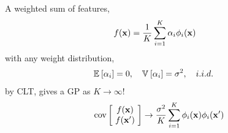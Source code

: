 \newsavebox\unistrain
\begin{lrbox}{\unistrain}
\hspace{0.1cm}
  \begin{minipage}{0.53\textwidth}
A weighted sum of features,
    \begin{align*}
f(\vx) & %
= \frac{1}{K} \sum_{i=1}^K \alpha_i \phi_i(\vx)
    \end{align*} 
with any weight distribution,
    \begin{align*}
\mathbb{E}_{} \left[ {\alpha_i} \right] & = 0, \quad \mathbb{V}_{} \left[ {\alpha_i} \right] = \sigma^2, \quad i.i.d.\ 
    \end{align*} 
by CLT, gives a GP as $K \to \infty$!
        \begin{align*}
\operatorname{cov} \left[ \! \begin{array}{c} f({\bf{x}}) \\ f({\bf{x}}') \end{array} \! \right] \to \frac{\sigma^2}{K}\sum_{i=1}^K \phi_i({\bf{x}})\phi_i({\bf{x}}')
    \end{align*} 
  \end{minipage}
\end{lrbox}


\def\layersep{2cm}
\def\nodesep{1.5cm}
\def\nodesize{1cm}

\newcommand{\numdims}[0]{3}
\newcommand{\numouts}[0]{1}
\newcommand{\numhidden}[0]{4}
\newcommand{\upnodedist}[0]{1cm}
\newcommand{\bardist}[0]{\hspace{-0.2cm}}

